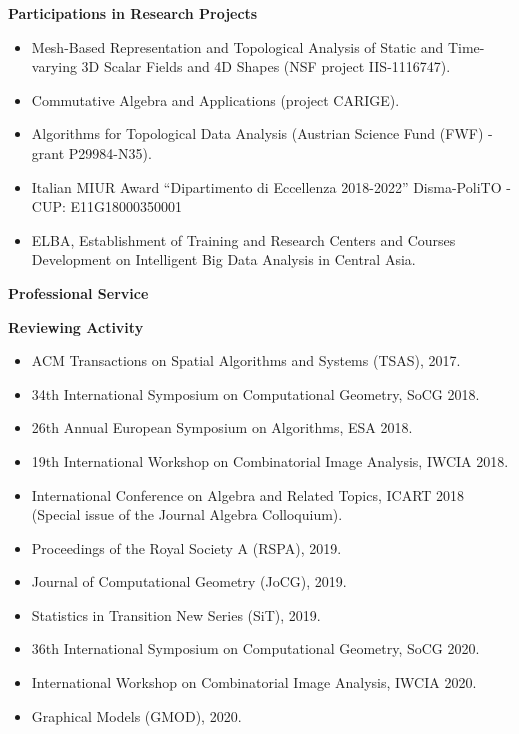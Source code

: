 \documentclass[11pt]{article}
\begin{document}
\vspace*{2.5ex}
\noindent
{\Large\bf Participations in Research Projects}
\begin{itemize}
\item Mesh-Based Representation and Topological Analysis of Static and Time-varying 3D Scalar Fields and 4D Shapes (NSF project IIS-1116747).
\item Commutative Algebra and Applications (project CARIGE).
\item Algorithms for Topological Data Analysis (Austrian Science Fund (FWF) - grant P29984-N35).
\item Italian MIUR Award ``Dipartimento di Eccellenza 2018-2022'' Disma-PoliTO - CUP: E11G18000350001
\item ELBA, Establishment of Training and Research Centers and Courses Development on Intelligent Big Data Analysis in Central Asia.
\end{itemize}




\vspace*{2.5ex}
\noindent
{\Large\bf Professional Service}

\vspace*{1.5ex}
\noindent
{\bf Reviewing Activity}
\begin{itemize}
  \item ACM Transactions on Spatial Algorithms and Systems (TSAS), 2017.
  \item 34th International Symposium on Computational Geometry, SoCG 2018.
  \item 26th Annual European Symposium on Algorithms, ESA 2018.
  \item 19th International Workshop on Combinatorial Image Analysis, IWCIA 2018.
  \item International Conference on Algebra and Related Topics, ICART 2018 (Special issue of the Journal Algebra Colloquium).
  \item Proceedings of the Royal Society A (RSPA), 2019.
  \item Journal of Computational Geometry (JoCG), 2019.
  \item Statistics in Transition New Series (SiT), 2019.
  \item 36th International Symposium on Computational Geometry, SoCG 2020.
  \item International Workshop on Combinatorial Image Analysis, IWCIA 2020.
  \item Graphical Models (GMOD), 2020.
\end{itemize}
\end{document}
